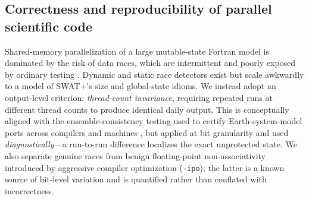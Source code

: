 \subsection{Correctness and reproducibility of parallel scientific code}
Shared-memory parallelization of a large mutable-state Fortran model is dominated by the risk
of data races, which are intermittent and poorly exposed by ordinary testing
\citep{Atzeni2016ARCHER}. Dynamic and static race detectors exist but scale awkwardly to a
model of SWAT+'s size and global-state idioms. We instead adopt an output-level criterion:
\emph{thread-count invariance}, requiring repeated runs at different thread counts to produce
identical daily output. This is conceptually aligned with the ensemble-consistency testing
used to certify Earth-system-model ports across compilers and machines
\citep{Baker2015CESMECT}, but applied at bit granularity and used \emph{diagnostically}---a
run-to-run difference localizes the exact unprotected state. We also separate genuine races
from benign floating-point non-associativity introduced by aggressive compiler optimization
(\texttt{-ipo}); the latter is a known source of bit-level variation \citep{IntelOneAPI} and
is quantified rather than conflated with incorrectness.
